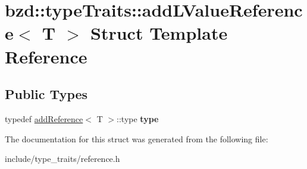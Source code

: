 \hypertarget{structbzd_1_1typeTraits_1_1addLValueReference}{}\section{bzd\+:\+:type\+Traits\+:\+:add\+L\+Value\+Reference$<$ T $>$ Struct Template Reference}
\label{structbzd_1_1typeTraits_1_1addLValueReference}
\subsection*{Public Types}
\begin{DoxyCompactItemize}
\item 
\mbox{\label{structbzd_1_1typeTraits_1_1addLValueReference_a3b76fc7eed79eb84ede55b90c3e25ce5}} 
typedef \hyperlink{structbzd_1_1typeTraits_1_1addReference}{add\+Reference}$<$ T $>$\+::type {\bfseries type}
\end{DoxyCompactItemize}


The documentation for this struct was generated from the following file\+:\begin{DoxyCompactItemize}
\item 
include/type\+\_\+traits/reference.\+h\end{DoxyCompactItemize}
